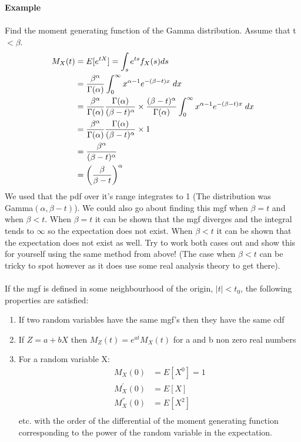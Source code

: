 \documentclass[,oneside]{article}
\begin{document}
\begin{enumerate}
\textbf{Example}\\ \\
Find the moment generating function of the Gamma distribution. Assume that t $< \beta$.
\begin{align*}
M_X(t)&=E[e^{tX}]=\int_s e^{ts}f_X(s)ds\\
&= \frac{\beta^\alpha}{\Gamma (\alpha)}\int_{0}^{\infty} x^{\alpha-1}e^{-(\beta-t)x}\hspace{0.1cm}dx\\
&= \frac{\beta^\alpha}{\Gamma (\alpha)} \frac{\Gamma (\alpha)}{(\beta-t)^{\alpha}} \times \frac{(\beta - t)^{\alpha}}{\Gamma (\alpha)} \int_{0}^{\infty} x^{\alpha-1}e^{-(\beta-t)x}\hspace{0.1cm}dx\\
&= \frac{\beta^\alpha}{\Gamma (\alpha)} \frac{\Gamma (\alpha)}{(\beta-t)^{\alpha}} \times 1\\
&= \frac{\beta^{\alpha}}{(\beta-t)^{\alpha}}\\
&=\left (\frac{\beta}{\beta-t} \right )^{\alpha}
\end{align*}
We used that the pdf over it's range integrates to 1 (The distribution was Gamma$(\alpha,\beta-t)$). We could also go about finding this mgf when $\beta = t$ and when $\beta < t$. When $\beta = t$ it can be shown that the mgf diverges and the integral tends to $\infty$ so the expectation does not exist. When $\beta < t$ it can be shown that the expectation does not exist as well. Try to work both cases out and show this for yourself using the same method from above! (The case when $\beta < t$ can be tricky to spot however as it does use some real analysis theory to get there).\\ \\
If the mgf is defined in some neighbourhood of the origin, $|t| < t_0$, the following properties are satisfied:
\begin{enumerate}
\item If two random variables have the same mgf's then they have the same cdf
\item If $Z=a+bX$ then $M_Z(t)=e^{at}M_X(t)$ for a and b non zero real numbers
\item For a random variable X:
\begin{align*}
M_X(0)&=E[X^0]=1\\
M_X^{'}(0)&=E[X]\\
M_X^{''}(0)&=E[X^2]\\
\end{align*}
etc. with the order of the differential of the moment generating function corresponding to the power of the random variable in the expectation. 

\end{enumerate}
\end{enumerate}
\end{document}
